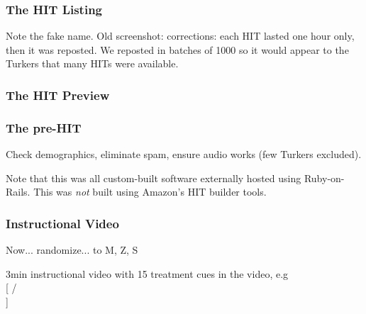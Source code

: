 \documentclass[slides]{beamer} %
\begin{document}
\begin{frame}\frametitle{The HIT Listing}


Note the fake name.  \pause Old screenshot: corrections: each HIT lasted one hour only, then it was reposted. We reposted in batches of 1000 so it would appear to the Turkers that many HITs were available. 


\end{frame}

\begin{frame}\frametitle{The HIT Preview}


\end{frame}

\begin{frame}\frametitle{The pre-HIT}


\scriptsize

Check demographics,  \pause eliminate spam,  \pause ensure audio works (few Turkers excluded).

\vspace{0.2cm}

Note that this was all custom-built software externally hosted using Ruby-on-Rails. This was \textit{not} built using Amazon's HIT builder tools.

\end{frame}

\begin{frame}\frametitle{Instructional Video}

Now... randomize... to M, Z, S \pause

 \pause

\footnotesize
3min instructional video with 15 treatment cues in the video, e.g\\
\vspace{0.3cm}
\tiny
[  /\\
]

\end{frame}
\end{document}
